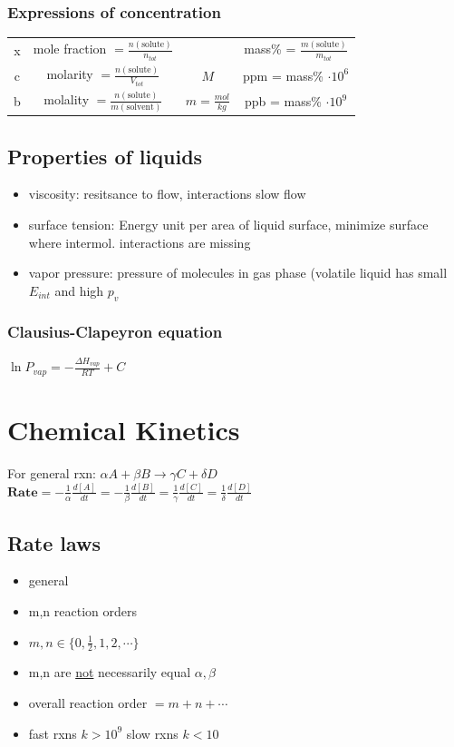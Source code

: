 \documentclass[ wastespaceontitle, english]{cheat_sheet_template}
\begin{document}
     \subsubsection{Expressions of concentration}
     \begin{tabular}{cccc}
         x & mole fraction $= \frac{n(\text{solute})}{n_{tot}}$ &  & mass\% = $ \frac{m(\text{solute})}{m_{tot}}$ \\
         c & molarity $= \frac{n(\text{solute})}{V_{tot}}$ & $M$ & ppm = mass\% $\cdot 10^6$ \\
         b & molality $= \frac{n(\text{solute})}{m(\text{solvent})}$ & $m = \frac{mol}{kg}$ & ppb = mass\% $\cdot 10^9$ 
     \end{tabular}
     \subsection{Properties of liquids}
    \begin{itemize}
       \item  viscosity: resitsance to flow, interactions slow flow
       \item surface tension: Energy unit per area of liquid surface, minimize surface where intermol. interactions are missing
        \item vapor pressure: pressure of molecules  in gas phase (volatile liquid has small $E_{int}$ and high $p_v$
    \end{itemize}
    
    \subsubsection{Clausius-Clapeyron equation}
   $\ln P_{vap} = - \frac{\Delta H_{vap}}{R T} + C$ 
   

\section{Chemical Kinetics}
    For general rxn: $\alpha A + \beta B \to \gamma C + \delta D$
     $\textbf{Rate}=- \frac{1}{\alpha} \frac{d [A]}{dt}= - \frac{1}{\beta} \frac{d [B]}{dt} = \frac{1}{\gamma} \frac{d [C]}{dt} = \frac{1}{\delta} \frac{d [D]}{dt}$ \\
    \subsection{Rate laws}
    \begin{itemize}
        \item general 
        \item m,n reaction orders
        \item $m,n \in \{0, \frac{1}{2}, 1,2, \cdots\}$
        \item m,n are \underline{not} necessarily equal $\alpha, \beta$
        \item overall reaction order $= m + n + \cdots$
        \item fast rxns $k > 10^9$ slow rxns $k < 10$
    \end{itemize}
\end{document}
